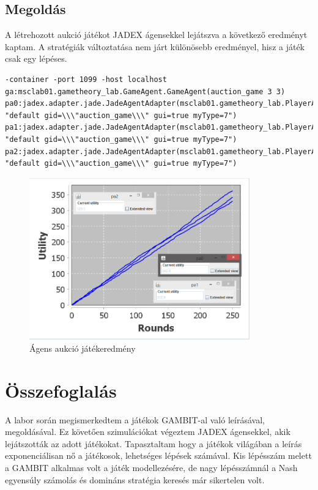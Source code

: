 \subsection{Megoldás}
A létrehozott aukció játékot JADEX ágensekkel lejátszva a következő eredményt kaptam. A stratégiák változtatása nem járt különösebb eredményel, hisz a játék csak egy lépéses.
\begin{lstlisting}[caption=Aukció run config, frame=single,float=!ht]
-container -port 1099 -host localhost 
ga:msclab01.gametheory_lab.GameAgent.GameAgent(auction_game 3 3) 
pa0:jadex.adapter.jade.JadeAgentAdapter(msclab01.gametheory_lab.PlayerAgent.Player 
"default gid=\\\"auction_game\\\" gui=true myType=7") 
pa1:jadex.adapter.jade.JadeAgentAdapter(msclab01.gametheory_lab.PlayerAgent.Player 
"default gid=\\\"auction_game\\\" gui=true myType=7")
pa2:jadex.adapter.jade.JadeAgentAdapter(msclab01.gametheory_lab.PlayerAgent.Player 
"default gid=\\\"auction_game\\\" gui=true myType=7")
\end{lstlisting}
\begin{figure}[!h]
\begin{center}
\includegraphics[height=7cm]{figures/auction_jadex.png}
\caption{Ágens aukció játékeredmény}
\end{center}
\end{figure}
\section{Összefoglalás}
A labor során megismerkedtem a játékok GAMBIT-al való leírásával, megoldásával. Ez követően szimulációkat végeztem JADEX ágensekkel, akik lejátszották az adott játékokat. Tapasztaltam hogy a játékok világában a leírás exponenciálisan nő a játékosok, lehetséges lépések számával. Kis lépésszám melett a GAMBIT alkalmas volt a játék modellezésére, de nagy lépésszámnál a Nash egyensúly számolás és domináns stratégia keresés már sikertelen volt.